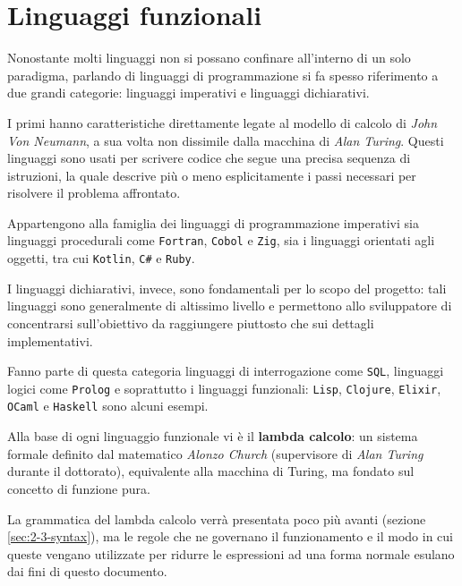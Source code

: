 \section{Linguaggi funzionali}
\label{sec:2-1-functional-languages}

Nonostante molti linguaggi non si possano confinare all'interno di un solo paradigma,
parlando di linguaggi di programmazione si fa spesso riferimento a due grandi categorie:
linguaggi imperativi e linguaggi dichiarativi.


I primi hanno caratteristiche direttamente legate al modello di calcolo di \textit{John Von Neumann},
a sua volta non dissimile dalla macchina di \textit{Alan Turing}.
Questi linguaggi sono usati per scrivere codice che segue una precisa sequenza di istruzioni,
la quale descrive più o meno esplicitamente i passi necessari per risolvere il problema affrontato.

\noindent Appartengono alla famiglia dei linguaggi di programmazione imperativi sia linguaggi procedurali come
\texttt{Fortran}, \texttt{Cobol} e \texttt{Zig}, sia i linguaggi orientati agli oggetti, tra cui \texttt{Kotlin}, \texttt{C\#} e \texttt{Ruby}.


I linguaggi dichiarativi, invece, sono fondamentali per lo scopo del progetto:
tali linguaggi sono generalmente di altissimo livello e permettono allo sviluppatore
di concentrarsi sull'obiettivo da raggiungere piuttosto che sui dettagli implementativi.

\noindent Fanno parte di questa categoria linguaggi di interrogazione come \texttt{SQL},
linguaggi logici come \texttt{Prolog} e soprattutto i linguaggi funzionali:
\texttt{Lisp}, \texttt{Clojure}, \texttt{Elixir}, \texttt{OCaml} e \texttt{Haskell} sono alcuni esempi.


Alla base di ogni linguaggio funzionale vi è il \textbf{lambda calcolo}: un sistema formale definito dal
matematico \textit{Alonzo Church} (supervisore di \textit{Alan Turing} durante il dottorato),
equivalente alla macchina di Turing, ma fondato sul concetto di funzione pura.

\newpage

\noindent La grammatica del lambda calcolo verrà presentata poco più avanti (sezione \ref{sec:2-3-syntax}),
ma le regole che ne governano il funzionamento e il modo in cui queste vengano utilizzate per ridurre
le espressioni ad una forma normale esulano dai fini di questo documento.

